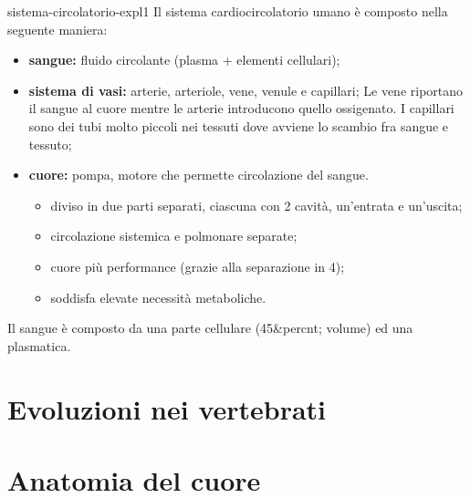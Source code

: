\documentclass[preview]{standalone}
\begin{document}
\begin{snippet}{sistema-circolatorio-expl1}
    Il sistema cardiocircolatorio umano è composto nella seguente maniera:
    \begin{itemize}
        \item \textbf{sangue:} fluido circolante (plasma + elementi cellulari);
        \item \textbf{sistema di vasi:} arterie, arteriole, vene, venule e capillari;
            Le vene riportano il sangue al cuore mentre le arterie introducono quello ossigenato.
            I capillari sono dei tubi molto piccoli nei tessuti dove avviene lo scambio fra sangue e tessuto;
        \item \textbf{cuore:} pompa, motore che permette circolazione del sangue.
            \begin{itemize}
                \item diviso in due parti separati, ciascuna con 2 cavità, un'entrata e un'uscita;
                \item circolazione sistemica e polmonare separate;
                \item cuore più performance (grazie alla separazione in 4);
                \item soddisfa elevate necessità metaboliche.
            \end{itemize}
    \end{itemize}
\end{snippet}

\begin{plainhtml}
    Il sangue è composto da una parte cellulare (45&percnt; volume) ed una plasmatica.
\end{plainhtml}


\section{Evoluzioni nei vertebrati}


\section{Anatomia del cuore}

\end{document}
